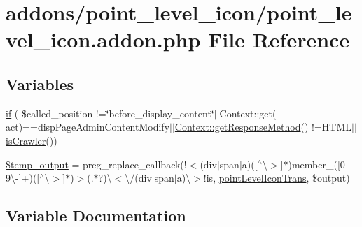 \hypertarget{point__level__icon_8addon_8php}{}\section{addons/point\+\_\+level\+\_\+icon/point\+\_\+level\+\_\+icon.addon.\+php File Reference}
\label{point__level__icon_8addon_8php}
\subsection*{Variables}
\begin{DoxyCompactItemize}
\item 
\hyperlink{point__level__icon_8addon_8php_a343bf9bf16148d253aa65319de0b3f16}{if} ( \$called\+\_\+position !=\char`\"{}before\+\_\+display\+\_\+content\char`\"{}$\vert$$\vert$Context\+::get( \textquotesingle{}act\textquotesingle{})==\textquotesingle{}disp\+Page\+Admin\+Content\+Modify\textquotesingle{}$\vert$$\vert$\hyperlink{classContext_a1d02a15209360034cd719d8b08cb5061}{Context\+::get\+Response\+Method}() !=\textquotesingle{}H\+T\+ML\textquotesingle{}$\vert$$\vert$\hyperlink{func_8inc_8php_a490ffbd4821da1995c76c381553d5b3d}{is\+Crawler}())
\item 
\hyperlink{point__level__icon_8addon_8php_a5866ef6f77cbeaf87d8208cf805bbc3d}{\$temp\+\_\+output} = preg\+\_\+replace\+\_\+callback(\textquotesingle{}!$<$(div$\vert$span$\vert$a)(\mbox{[}$^\wedge$\textbackslash{}$>$\mbox{]}$\ast$)member\+\_\+(\mbox{[}0-\/9\textbackslash{}-\/\mbox{]}+)(\mbox{[}$^\wedge$\textbackslash{}$>$\mbox{]}$\ast$)$>$(.$\ast$?)\textbackslash{}$<$\textbackslash{}/(div$\vert$span$\vert$a)\textbackslash{}$>$!is\textquotesingle{}, \textquotesingle{}\hyperlink{point__level__icon_8lib_8php_a6581bcaf11de4c31924e7a5de3d6887d}{point\+Level\+Icon\+Trans}\textquotesingle{}, \$output)
\end{DoxyCompactItemize}


\subsection{Variable Documentation}
\hypertarget{point__level__icon_8addon_8php_a5866ef6f77cbeaf87d8208cf805bbc3d}{}\label{point__level__icon_8addon_8php_a5866ef6f77cbeaf87d8208cf805bbc3d} 
